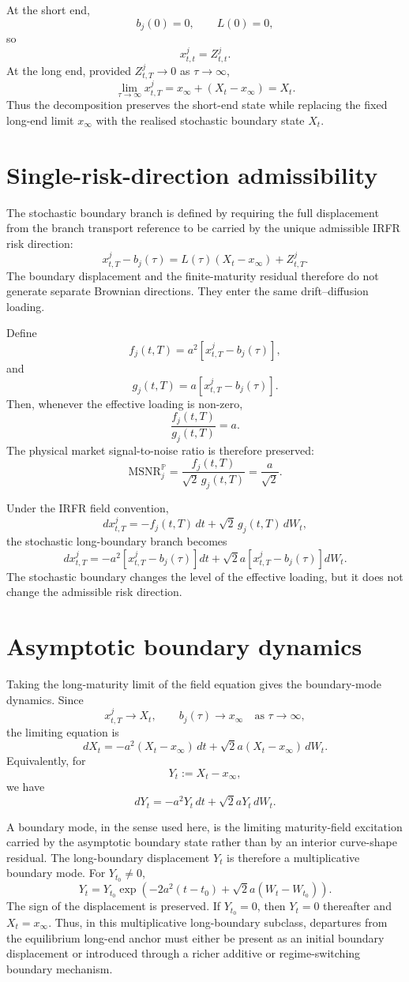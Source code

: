 \documentclass[11pt]{article}
\begin{document}
At the short end,
\[
b_j(0)=0,
\qquad
L(0)=0,
\]
so
\[
x^j_{t,t}=Z^j_{t,t}.
\]
At the long end, provided \(Z^j_{t,T}\to0\) as \(\tau\to\infty\),
\[
\lim_{\tau\to\infty}x^j_{t,T}
=
x_\infty+(X_t-x_\infty)
=
X_t.
\]
Thus the decomposition preserves the short-end state while replacing the fixed long-end limit \(x_\infty\) with the realised stochastic boundary state \(X_t\).

\section{Single-risk-direction admissibility}

The stochastic boundary branch is defined by requiring the full displacement from the branch transport reference to be carried by the unique admissible IRFR risk direction:
\[
x^j_{t,T}-b_j(\tau)
=
L(\tau)(X_t-x_\infty)+Z^j_{t,T}.
\]
The boundary displacement and the finite-maturity residual therefore do not generate separate Brownian directions. They enter the same drift--diffusion loading.

Define
\[
f_j(t,T)
=
a^2\left[x^j_{t,T}-b_j(\tau)\right],
\]
and
\[
g_j(t,T)
=
a\left[x^j_{t,T}-b_j(\tau)\right].
\]
Then, whenever the effective loading is non-zero,
\[
\frac{f_j(t,T)}{g_j(t,T)}
=
a.
\]
The physical market signal-to-noise ratio is therefore preserved:
\[
\mathrm{MSNR}^{\mathbb P}_j
=
\frac{f_j(t,T)}{\sqrt{2}\,g_j(t,T)}
=
\frac{a}{\sqrt{2}}.
\]

Under the IRFR field convention,
\[
dx^j_{t,T}
=
-f_j(t,T)\,dt
+
\sqrt{2}\,g_j(t,T)\,dW_t,
\]
the stochastic long-boundary branch becomes
\[
dx^j_{t,T}
=
-a^2\left[x^j_{t,T}-b_j(\tau)\right]dt
+
\sqrt{2}a\left[x^j_{t,T}-b_j(\tau)\right]dW_t.
\]
The stochastic boundary changes the level of the effective loading, but it does not change the admissible risk direction.

\section{Asymptotic boundary dynamics}

Taking the long-maturity limit of the field equation gives the boundary-mode dynamics. Since
\[
x^j_{t,T}\to X_t,
\qquad
b_j(\tau)\to x_\infty
\quad
\text{as }\tau\to\infty,
\]
the limiting equation is
\[
dX_t
=
-a^2(X_t-x_\infty)\,dt
+
\sqrt{2}a(X_t-x_\infty)\,dW_t.
\]
Equivalently, for
\[
Y_t:=X_t-x_\infty,
\]
we have
\[
dY_t
=
-a^2Y_t\,dt
+
\sqrt{2}aY_t\,dW_t.
\]

A boundary mode, in the sense used here, is the limiting maturity-field excitation carried by the asymptotic boundary state rather than by an interior curve-shape residual. The long-boundary displacement \(Y_t\) is therefore a multiplicative boundary mode. For \(Y_{t_0}\neq0\),
\[
Y_t
=
Y_{t_0}
\exp\left(
-2a^2(t-t_0)
+
\sqrt{2}a(W_t-W_{t_0})
\right).
\]
The sign of the displacement is preserved. If \(Y_{t_0}=0\), then \(Y_t=0\) thereafter and \(X_t=x_\infty\). Thus, in this multiplicative long-boundary subclass, departures from the equilibrium long-end anchor must either be present as an initial boundary displacement or introduced through a richer additive or regime-switching boundary mechanism.
\end{document}
